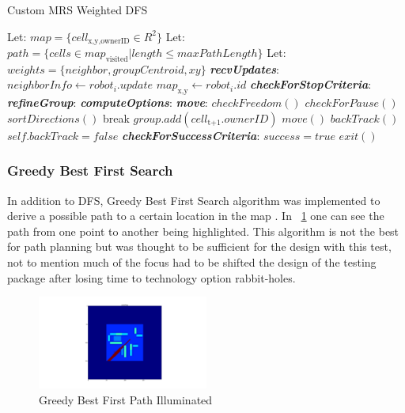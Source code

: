\begin{algorithm}[H]
\begin{algorithmic}[1]
\caption{Custom MRS Weighted DFS}
\State Let: $map = \{cell_\text{x,y,ownerID} \in R^{2}\}$
\State Let: $path = \{cells \in map_\text{visited} | length \leq maxPathLength\}$
\State Let: $weights = \{neighbor,groupCentroid,xy\}$
\newline
{}
\BState \emph{\textbf{recvUpdates}}:
  \State $neighborInfo \gets robot_i.update$
  \State $map_\text{x,y} \gets robot_i.id$
\BState \emph{\textbf{checkForStopCriteria}}:
   \Return
  \EndIf
\BState \emph{\textbf{refineGroup}}:
\BState \emph{\textbf{computeOptions}}:
\BState \emph{\textbf{move}}:
  \State $checkFreedom()$
  \State $checkForPause()$
  \State $sortDirections()$
     break
    \EndIf
      \State $group.add(cell_\text{t+1}.ownerID)$
      \State $move()$
    \EndIf
  \EndFor
    \State $backTrack()$
    \State $self.backTrack = false$
  \EndIf
\BState \emph{\textbf{checkForSuccessCriteria}}:
    \State $success = true$
    \State $exit()$
  \EndIf

\EndProcedure
\end{algorithmic}
\end{algorithm}


\subsubsection{Greedy Best First Search}

In addition to DFS, Greedy Best First Search algorithm was implemented to derive a
possible path to a certain location in the map \cite{GBF}. In ~\ref{fig:gbf} one can see the
path from one point to another being highlighted. This algorithm is not the best
for path planning but was thought to be sufficient for the design with this test, not
to mention much of the focus had to be shifted the design of the testing package after
losing time to technology option rabbit-holes.

\begin{figure}[H]
  \centering
    \includegraphics[width=0.5\textwidth]{pathAllocator}
  \caption{Greedy Best First Path Illuminated}
  \label{fig:gbf}
\end{figure}


